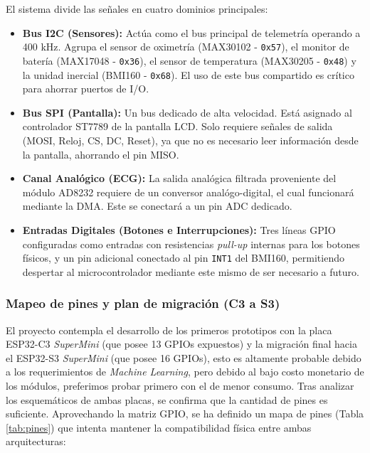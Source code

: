 \documentclass[letterpaper,11pt]{article}
\newcommand{\rtabla}[1]{Tabla \ref{#1}}
\begin{document}
El sistema divide las señales en cuatro dominios principales:
\begin{itemize}
    \item \textbf{Bus I2C (Sensores):} Actúa como el bus principal de telemetría operando a 400 kHz. Agrupa el sensor de oximetría (MAX30102 - \texttt{0x57}), el monitor de batería (MAX17048 - \texttt{0x36}), el sensor de temperatura (MAX30205 - \texttt{0x48}) y la unidad inercial (BMI160 - \texttt{0x68}). El uso de este bus compartido es crítico para ahorrar puertos de I/O.
    \item \textbf{Bus SPI (Pantalla):} Un bus dedicado de alta velocidad. Está asignado al controlador ST7789 de la pantalla LCD. Solo requiere señales de salida (MOSI, Reloj, CS, DC, Reset), ya que no es necesario leer información desde la pantalla, ahorrando el pin MISO.
    \item \textbf{Canal Analógico (ECG):} La salida analógica filtrada proveniente del módulo AD8232 requiere de un conversor analógo-digital, el cual funcionará mediante la DMA. Este se conectará a un pin ADC dedicado.
    \item \textbf{Entradas Digitales (Botones e Interrupciones):} Tres líneas GPIO configuradas como entradas con resistencias \textit{pull-up} internas para los botones físicos, y un pin adicional conectado al pin \texttt{INT1} del BMI160, permitiendo despertar al microcontrolador mediante este mismo de ser necesario a futuro.
\end{itemize}

\subsubsection{Mapeo de pines y plan de migración (C3 a S3)}
El proyecto contempla el desarrollo de los primeros prototipos con la placa ESP32-C3 \textit{SuperMini} (que posee 13 GPIOs expuestos) y la migración final hacia el ESP32-S3 \textit{SuperMini} (que posee 16 GPIOs), esto es altamente probable debido a los requerimientos de \textit{Machine Learning}, pero debido al bajo costo monetario de los módulos, preferimos probar primero con el de menor consumo. Tras analizar los esquemáticos de ambas placas, se confirma que la cantidad de pines es suficiente. Aprovechando la matriz GPIO, se ha definido un mapa de pines (\rtabla{tab:pines}) que intenta mantener la compatibilidad física entre ambas arquitecturas:
\end{document}

